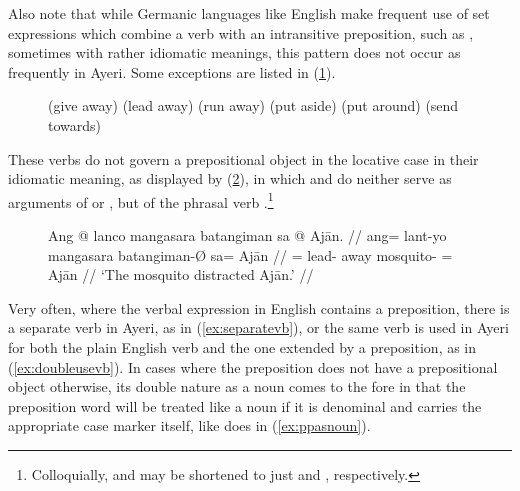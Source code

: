 Also note that while Germanic languages like English make frequent use of set
expressions which combine a verb with an intransitive preposition, such as
, sometimes with rather idiomatic
meanings, this pattern does not occur as frequently in Ayeri. Some exceptions
are listed in (\ref{ex:particleverbs}).

\begin{figure}[h]
\pex\label{ex:particleverbs}
\a {} (give away)
\a {} (lead away)
\a {} (run away)
\a {} (put
	aside)
\a {} (put around)
\a {} (send towards)
\xe
\end{figure}

These verbs do not govern a prepositional object in the locative case in their
idiomatic meaning, as displayed by (\ref{ex:mgsrobjdep}), in which
 and  do neither serve as
arguments of  or , but of the phrasal
verb .\footnote{Colloquially,
 and  may be shortened to just
 and , respectively.}

\begin{figure}[h]
\ex\label{ex:mgsrobjdep}\begingl
	\gla Ang @ lanco mangasara batangiman sa @ Ajān. //
	\glb ang= lant-yo mangasara batangiman-Ø sa= Ajān //
	\glc \AgtT{}= lead-\TsgN{} away mosquito-\Top{} \Parg{}= Ajān //
	\glft `The mosquito distracted Ajān.' //
\endgl\xe
\end{figure}

Very often, where the verbal expression in English contains a preposition,
there is a separate verb in Ayeri, as in (\ref{ex:separatevb}), or the same
verb is used in Ayeri for both the plain English verb and the one extended by a
preposition, as in (\ref{ex:doubleusevb}). In cases where the preposition does
not have a prepositional object otherwise, its double nature as a noun comes to
the fore in that the preposition word will be treated like a noun if it is
denominal and carries the appropriate case marker itself, like
 does in (\ref{ex:ppasnoun}).

